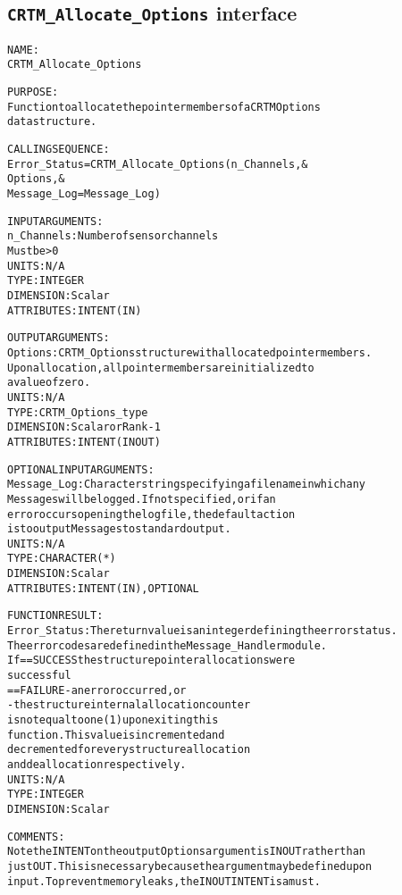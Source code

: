 \subsection{\texttt{CRTM\_Allocate\_Options} interface}
  \label{sec:CRTM_Allocate_Options_interface}
  \begin{alltt}
 
  NAME:
        CRTM_Allocate_Options
  
  PURPOSE:
        Function to allocate the pointer members of a CRTM Options
        data structure.
 
  CALLING SEQUENCE:
        Error_Status = CRTM_Allocate_Options( n_Channels             , &
                                              Options                , &
                                              Message_Log=Message_Log  )
 
  INPUT ARGUMENTS:
        n_Channels:   Number of sensor channels
                      Must be > 0
                      UNITS:      N/A
                      TYPE:       INTEGER
                      DIMENSION:  Scalar
                      ATTRIBUTES: INTENT(IN)
 
  OUTPUT ARGUMENTS:
        Options:      CRTM_Options structure with allocated pointer members.
                      Upon allocation, all pointer members are initialized to
                      a value of zero.
                      UNITS:      N/A
                      TYPE:       CRTM_Options_type
                      DIMENSION:  Scalar or Rank-1
                      ATTRIBUTES: INTENT(IN OUT)
 
  OPTIONAL INPUT ARGUMENTS:
        Message_Log:  Character string specifying a filename in which any
                      Messages will be logged. If not specified, or if an
                      error occurs opening the log file, the default action
                      is to output Messages to standard output.
                      UNITS:      N/A
                      TYPE:       CHARACTER(*)
                      DIMENSION:  Scalar
                      ATTRIBUTES: INTENT(IN), OPTIONAL
 
  FUNCTION RESULT:
        Error_Status: The return value is an integer defining the error status.
                      The error codes are defined in the Message_Handler module.
                      If == SUCCESS the structure pointer allocations were
                                    successful
                         == FAILURE - an error occurred, or
                                    - the structure internal allocation counter
                                      is not equal to one (1) upon exiting this
                                      function. This value is incremented and
                                      decremented for every structure allocation
                                      and deallocation respectively.
                      UNITS:      N/A
                      TYPE:       INTEGER
                      DIMENSION:  Scalar
 
  COMMENTS:
        Note the INTENT on the output Options argument is IN OUT rather than
        just OUT. This is necessary because the argument may be defined upon
        input. To prevent memory leaks, the IN OUT INTENT is a must.
 
  \end{alltt}
